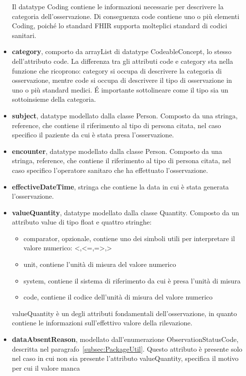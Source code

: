 \documentclass[a4paper]{article}
\begin{document}
\begin{itemize}
\begin{itemize}
    \end{itemize}
    Il datatype Coding contiene le informazioni necessarie per descrivere la categoria dell'osservazione.
    Di conseguenza code contiene uno o più elementi Coding, poiché lo standard FHIR supporta molteplici standard di codici sanitari.
    \item \textbf{category}, comporto da arrayList di datatype CodeableConcept, lo stesso dell'attributo code. La differenza tra gli attributi code e category sta nella funzione che ricoprono: category si occupa di descrivere la categoria di osservazione, mentre code si occupa di descrivere il tipo di osservazione in uno o più standard medici.
    \'E importante sottolineare come il tipo sia un sottoinsieme della categoria.
    \item \textbf{subject}, datatype modellato dalla classe Person. Composto da una stringa, reference, che contiene il riferimento al tipo di persona citata, nel caso specifico il paziente da cui è stata presa l'osservazione.
    \item \textbf{encounter}, datatype modellato dalla classe Person. Composto da una stringa, reference, che contiene il riferimento al tipo di persona citata, nel caso specifico l'operatore sanitaro che ha effettuato l'osservazione.
    \item \textbf{effectiveDateTime}, stringa che contiene la data in cui è stata generata l'osservazione.
    \item \textbf{valueQuantity}, datatype modellato dalla classe Quantity. Composto da un attributo value di tipo float e quattro stringhe:
    \begin{itemize}
        \item comparator, opzionale, contiene uno dei simboli utili per interpretare il valore numerico: <,<=,=>,> 
        \item unit, contiene l'unità di misura del valore numerico
        \item system, contiene il sistema di riferimento da cui è presa l'unità di misura
        \item code, contiene il codice dell'unità di misura del valore numerico
    \end{itemize}
    valueQuantity è un degli attributi fondamentali dell'osservazione, in quanto contiene le informazioni sull'effettivo valore della rilevazione.
    \item \textbf{dataAbsentReason}, modellato dall'enumerazione ObservationStatusCode, descritta nel paragrafo~\ref{subsec:PackageUtil}.
    Questo attributo è presente solo nel caso in cui non sia presente l'attributo valueQuantity, specifica il motivo per cui il valore manca

\end{itemize}
\end{document}
